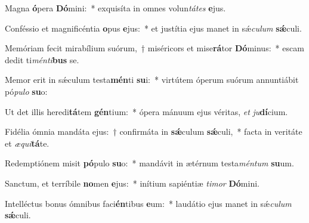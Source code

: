 ﻿\item Magna \textbf{ó}pera \textbf{Dó}mini:~* exquisíta in omnes volun\textit{tá}\textit{tes} \textbf{e}jus.

\item Conféssio et magnificéntia \textbf{o}pus \textbf{e}jus:~* et justítia ejus manet in sǽ\textit{cu}\textit{lum} \textbf{sǽ}culi.

\item Memóriam fecit mirabílium suórum,~† miséricors et mise\textbf{rá}tor \textbf{Dó}minus:~* escam dedit ti\textit{mén}\textit{ti}\textbf{bus} se.

\item Memor erit in sǽculum testa\textbf{mén}ti \textbf{su}i:~* virtútem óperum suórum annuntiábit pó\textit{pu}\textit{lo} \textbf{su}o:

\item Ut det illis heredi\textbf{tá}tem \textbf{gén}tium:~* ópera mánuum ejus véritas, \textit{et} \textit{ju}\textbf{dí}cium.

\item Fidélia ómnia mandáta ejus:~† confirmáta in \textbf{sǽ}culum \textbf{sǽ}culi,~* facta in veritáte et \textit{æ}\textit{qui}\textbf{tá}te.

\item Redemptiónem misit \textbf{pó}pulo \textbf{su}o:~* mandávit in ætérnum testa\textit{mén}\textit{tum} \textbf{su}um.

\item Sanctum, et terríbile \textbf{no}men \textbf{e}jus:~* inítium sapiéntiæ \textit{ti}\textit{mor} \textbf{Dó}mini.

\item Intelléctus bonus ómnibus faci\textbf{én}tibus \textbf{e}um:~* laudátio ejus manet in sǽ\textit{cu}\textit{lum} \textbf{sǽ}culi.